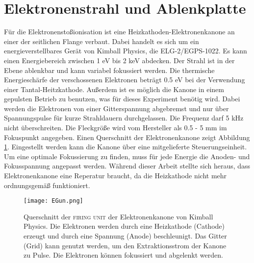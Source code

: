 \section{Elektronenstrahl und Ablenkplatte}
\label{sec:Elektronenstrahl}
Für die Elektronenstoßionisation ist eine Heizkathoden-Elektronenkanone an einer der seitlichen Flange verbaut. Dabei handelt es sich um ein energieverstellbares Gerät von Kimball Physics, die ELG-2/EGPS-1022. Es kann einen Energiebereich zwischen 1 eV bis 2 keV abdecken. Der Strahl ist in der Ebene ablenkbar und kann variabel fokussiert werden. Die thermische Energieschärfe der verschossenen Elektronen beträgt 0.5 eV bei der Verwendung einer Tantal-Heitzkathode. Außerdem ist es möglich die Kanone in einem gepulsten Betrieb zu benutzen, was für dieses Experiment benötig wird. Dabei werden die Elektronen von einer Gitterspannung abgebremst und nur über Spannungspulse für kurze Strahldauern durchgelassen. Die Frequenz darf 5 kHz nicht überschreiten. Die Fleckgröße wird vom Hersteller als 0.5 - 5 mm im Fokuspunkt angegeben. Einen Querschnitt der Elektronenkanone zeigt Abbildung \ref{fig:EGun}. Eingestellt werden kann die Kanone über eine mitgelieferte Steuerungseinheit. Um eine optimale Fokussierung zu finden, muss für jede Energie die Anoden- und Fokusspannung angepasst werden. Während dieser Arbeit stellte sich heraus, dass Elektronenkanone eine Reperatur braucht, da die Heizkathode nicht mehr ordnungsgemäß funktioniert.

\begin{figure}
    \centering
    \texttt{[image: EGun.png]}
    \caption[Querschnitt der \textsc{firing unit} der Elektronenkanone]{Querschnitt der \textsc{firing unit} der Elektronenkanone von Kimball Physics. Die Elektronen werden durch eine Heizkathode (Cathode) erzeugt und durch eine Spannung (Anode) beschleunigt. Das Gitter (Grid) kann genutzt werden, um den Extraktionsstrom der Kanone zu Pulse. Die Elektronen können fokussiert und abgelenkt werden.}
    \label{fig:EGun}
\end{figure}

